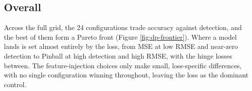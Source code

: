 \documentclass[
]{krantz}
\begin{document}
\begin{table}[!h]
\centering
\caption{\label{tab:dp-seasonal-results}Static-feature encoding performance on the test set. $\Delta$ is the seasonal encoder minus naive.}
\centering
{}
\end{table}

\subsection{Overall}\label{overall}

Across the full grid, the 24 configurations trade accuracy against detection, and the best of them form a Pareto front (Figure \ref{fig:dp-frontier}).
Where a model lands is set almost entirely by the loss, from MSE at low RMSE and near-zero detection to Pinball at high detection and high RMSE, with the hinge losses between.
The feature-injection choices only make small, loss-specific differences, with no single configuration winning throughout, leaving the loss as the dominant control.
\end{document}
